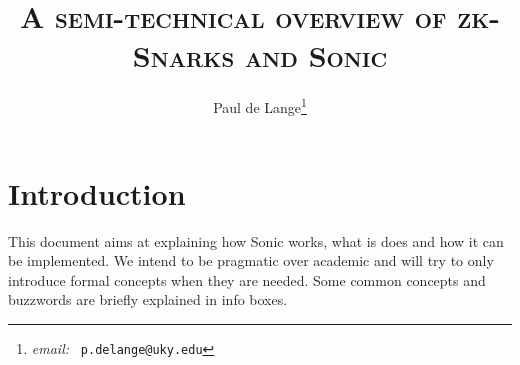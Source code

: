 \documentclass[11pt,oneside]{article}
\theoremstyle{definition}
\theoremstyle{remark}
\numberwithin{equation}{section}
\begin{document}

\title{ \vspace{-35pt} \textsc{\huge{{A} semi-technical overview of zk-{S}narks
and {S}onic\\} } }

\renewcommand{\thefootnote}{\fnsymbol{footnote}}
\renewcommand{\thefootnote}{\arabic{footnote}} 

\author{ Paul de Lange\footnote{{\em email:} {\tt
p.delange@uky.edu} } }

\maketitle


\clearpage

\tableofcontents

\clearpage

\section{Introduction}\label{sec:intro}
This document aims at explaining how Sonic works, what is does and how it can be
implemented. We intend to be pragmatic over academic and will try to only introduce
formal concepts when they are needed. Some common concepts and buzzwords are briefly
explained in info boxes.

\clearpage
\end{document}
